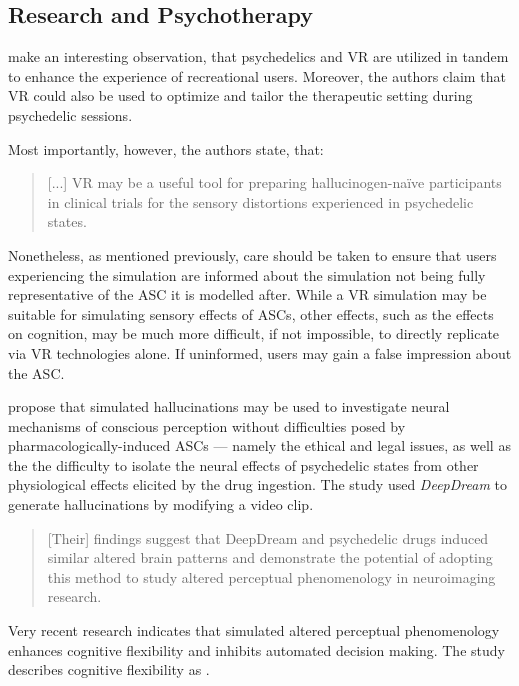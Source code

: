 \subsection{Research and Psychotherapy}
\textcite{aday2020psychedelics} make an interesting observation, that psychedelics and VR are utilized in tandem to enhance the experience of recreational users. Moreover, the authors claim that VR could also be used to optimize and tailor the therapeutic setting during psychedelic sessions.

Most importantly, however, the authors state, that:

\begin{quote}
    [...] VR may be a useful tool for preparing hallucinogen-naïve participants in clinical trials for the sensory distortions experienced in psychedelic states.
\end{quote}

Nonetheless, as mentioned previously, care should be taken to ensure that users experiencing the simulation are informed about the simulation not being fully representative of the \ac{ASC} it is modelled after. While a \ac{VR} simulation may be suitable for simulating sensory effects of \acp{ASC}, other effects, such as the effects on cognition, may be much more difficult, if not impossible, to directly replicate via \ac{VR} technologies alone. If uninformed, users may gain a false impression about the \ac{ASC}.

\textcite{greco2021increased} propose that simulated hallucinations may be used to investigate neural mechanisms of conscious perception without difficulties posed by pharmacologically-induced \acp{ASC} --- namely the ethical and legal issues, as well as the the difficulty to isolate the neural effects of psychedelic states from other physiological effects elicited by the drug ingestion. The study used \textit{DeepDream} \autocite{mordvintsev2015inceptionism} to generate hallucinations by modifying a video clip.

\begin{quote}
    [Their] findings suggest that DeepDream and psychedelic drugs induced similar altered brain patterns and demonstrate the potential of adopting this method to study altered perceptual phenomenology in neuroimaging research.
\end{quote}

Very recent research \autocite{rastelli2021simulated} indicates that simulated altered perceptual phenomenology enhances cognitive flexibility and inhibits automated decision making. The study describes cognitive flexibility as .

